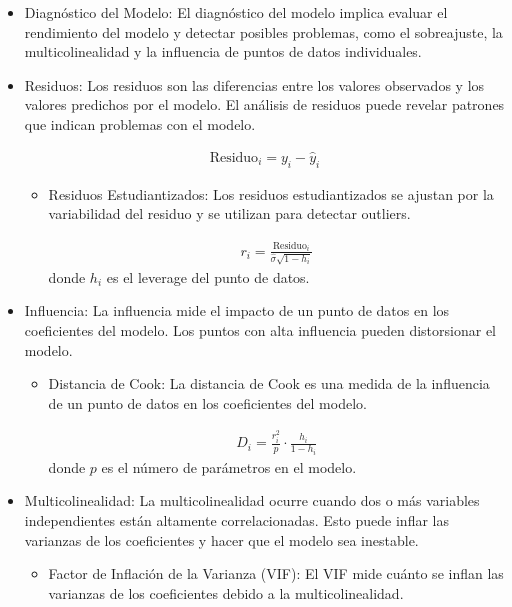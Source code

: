\documentclass[a4paper]{report} %
\begin{document}
\begin{itemize}
\item Diagn\'ostico del Modelo: El diagn\'ostico del modelo implica evaluar el rendimiento del modelo y detectar posibles problemas, como el sobreajuste, la multicolinealidad y la influencia de puntos de datos individuales.

\item Residuos: Los residuos son las diferencias entre los valores observados y los valores predichos por el modelo. El an\'alisis de residuos puede revelar patrones que indican problemas con el modelo.

\begin{eqnarray*}
\text{Residuo}_i = y_i - \hat{y}_i
\end{eqnarray*}
\begin{itemize}

\item Residuos Estudiantizados: Los residuos estudiantizados se ajustan por la variabilidad del residuo y se utilizan para detectar outliers.

\begin{eqnarray*}
r_i = \frac{\text{Residuo}_i}{\hat{\sigma} \sqrt{1 - h_i}}
\end{eqnarray*}
donde $h_i$ es el leverage del punto de datos.
\end{itemize}

\item Influencia: La influencia mide el impacto de un punto de datos en los coeficientes del modelo. Los puntos con alta influencia pueden distorsionar el modelo.
\begin{itemize}
\item Distancia de Cook: La distancia de Cook es una medida de la influencia de un punto de datos en los coeficientes del modelo.

\begin{eqnarray*}
D_i = \frac{r_i^2}{p} \cdot \frac{h_i}{1 - h_i}
\end{eqnarray*}
donde $p$ es el n\'umero de par\'ametros en el modelo.
\end{itemize}

\item Multicolinealidad: La multicolinealidad ocurre cuando dos o m\'as variables independientes est\'an altamente correlacionadas. Esto puede inflar las varianzas de los coeficientes y hacer que el modelo sea inestable.
\begin{itemize}
\item Factor de Inflaci\'on de la Varianza (VIF): El VIF mide cu\'anto se inflan las varianzas de los coeficientes debido a la multicolinealidad.


\end{itemize}
\end{itemize}
\end{document}
